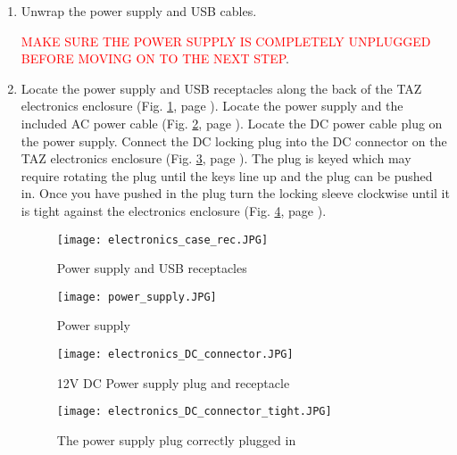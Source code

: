 \begin{enumerate}
\item Unwrap the power supply and USB cables.

\textcolor{red}{MAKE SURE THE POWER SUPPLY IS COMPLETELY UNPLUGGED BEFORE MOVING ON TO THE NEXT STEP}.

\item Locate the power supply and USB receptacles along the back of the TAZ electronics enclosure
(Fig. \ref{fig:electronics_plugs}, page \pageref{fig:electronics_plugs}). Locate the power supply and the included AC power cable (Fig. \ref{fig:power_supply}, page \pageref{fig:power_supply}). Locate the DC power cable plug on the power supply. Connect the DC locking plug into the DC connector on the TAZ electronics enclosure (Fig. \ref{fig:ps_plug}, page \pageref{fig:ps_plug}). The plug is keyed which may require rotating the plug until the keys line up and the plug can be pushed in. Once you have pushed in the plug turn the locking sleeve clockwise until it is tight against the electronics enclosure (Fig. \ref{fig:electronics_plugs_plugged-in}, page \pageref{fig:electronics_plugs_plugged-in}).
\begin{figure}[H]
\centering
\texttt{[image: electronics\_case\_rec.JPG]}
\caption{Power supply and USB receptacles}
\label{fig:electronics_plugs}
\end{figure}

\begin{figure}[H]
\centering
\texttt{[image: power\_supply.JPG]}
\caption{Power supply}
\label{fig:power_supply}
\end{figure}

\begin{figure}[H]
\centering
\texttt{[image: electronics\_DC\_connector.JPG]}
\caption{12V DC Power supply plug and receptacle}
\label{fig:ps_plug}
\end{figure}

\begin{figure}[H]
\centering
\texttt{[image: electronics\_DC\_connector\_tight.JPG]}
\caption{The power supply plug correctly plugged in}
\label{fig:electronics_plugs_plugged-in}
\end{figure}


\end{enumerate}
